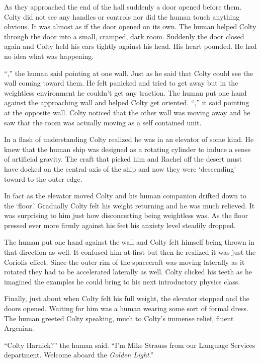 As they approached the end of the hall suddenly a door opened before them. Colty did not see any
handles or controls nor did the human touch anything obvious. It was almost as if the door
opened on its own. The human helped Colty through the door into a small, cramped, dark room.
Suddenly the door closed again and Colty held his ears tightly against his head. His heart
pounded. He had no idea what was happening.

``,'' the human said pointing at one wall. Just as he said that Colty could
see the wall coming toward them. He felt panicked and tried to get away but in the weightless
environment he couldn't get any traction. The human put one hand against the approaching wall
and helped Colty get oriented. ``,'' it said pointing at the opposite wall.
Colty noticed that the other wall was moving away and he saw that the room was actually moving
as a self contained unit.

In a flash of understanding Colty realized he was in an elevator of some kind. He knew that the
human ship was designed as a rotating cylinder to induce a sense of artificial gravity. The
craft that picked him and Rachel off the desert must have docked on the central axis of the ship
and now they were `descending' toward to the outer edge.

In fact as the elevator moved Colty and his human companion drifted down to the `floor.'
Gradually Colty felt his weight returning and he was much relieved. It was surprising to him
just how disconcerting being weightless was. As the floor pressed ever more firmly against his
feet his anxiety level steadily dropped.

The human put one hand against the wall and Colty felt himself being thrown in that direction as
well. It confused him at first but then he realized it was just the Coriolis effect. Since the
outer rim of the spacecraft was moving laterally as it rotated they had to be accelerated
laterally as well. Colty clicked his teeth as he imagined the examples he could bring to his
next introductory physics class.

Finally, just about when Colty felt his full weight, the elevator stopped and the doors opened.
Waiting for him was a human wearing some sort of formal dress. The human greeted Colty speaking,
much to Colty's immense relief, fluent Argenian.

``Colty Harnick?'' the human said. ``I'm Mike Strauss from our Language Services department.
Welcome aboard the \textit{Golden Light}.''


